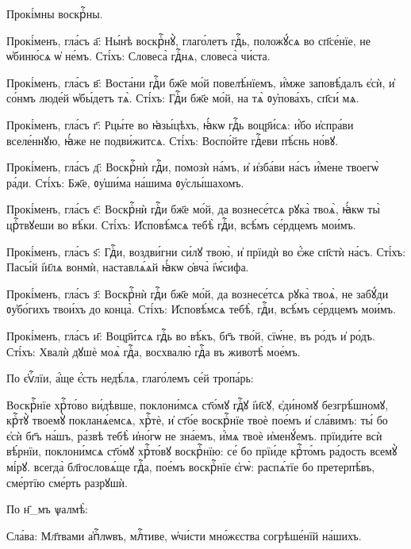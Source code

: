 \hKv Прокі́мны воскрⷭ҇ны. 

\hKv Прокі́менъ, гла́съ а҃: Ны́нѣ воскрⷭ҇нꙋ̀, глаго́летъ гдⷭ҇ь,  положꙋ́сѧ во сп҃се́нїе, не ѡ҆биню́сѧ ѡ҆ не́мъ. Сті́хъ:  Словеса̀ гдⷭ҇нѧ, словеса̀ чи́ста. 

\hKv Прокі́менъ, гла́съ в҃: Воста́ни гдⷭ҇и бж҃е мо́й  повелѣ́нїемъ, и҆́мже заповѣ́далъ є҆сѝ, и҆ со́нмъ люде́й  ѡ҆бы́детъ тѧ̀. Сті́хъ: Гдⷭ҇и бж҃е мо́й, на тѧ̀ ᲂу҆пова́хъ,  сп҃си́ мѧ. 

\hKv Прокі́менъ, гла́съ г҃: Рцы́те во ꙗ҆зы́цѣхъ, ꙗ҆́кѡ гдⷭ҇ь  воцр҃и́сѧ: и҆́бо и҆спра́ви вселе́ннꙋю, ꙗ҆́же не  подви́житсѧ. Сті́хъ: Воспо́йте гдⷭ҇еви пѣ́снь но́вꙋ. 

\hKv Прокі́менъ, гла́съ д҃: Воскрⷭ҇нѝ гдⷭ҇и, помозѝ на́мъ, и҆  и҆зба́ви на́съ и҆́мене твоегѡ̀ ра́ди. Сті́хъ: Бж҃е,  ᲂу҆ши́ма на́шима ᲂу҆слы́шахомъ.  

\hKv Прокі́менъ, гла́съ є҃: Воскрⷭ҇нѝ гдⷭ҇и бж҃е мо́й, да  вознесе́тсѧ рꙋка̀ твоѧ̀, ꙗ҆́кѡ ты̀ црⷭ҇твꙋеши во вѣ́ки.  Сті́хъ: И҆сповѣ́мсѧ тебѣ̀ гдⷭ҇и, всѣ́мъ се́рдцемъ мои́мъ. 

\hKv Прокі́менъ, гла́съ ѕ҃: Гдⷭ҇и, воздви́гни си́лꙋ твою̀, и҆  прїидѝ во є҆́же сп҃стѝ на́съ. Сті́хъ: Пасы́й і҆и҃лѧ  вонмѝ, наставлѧ́ѧй ꙗ҆́кѡ ѻ҆вча̀ і҆ѡ́сифа. 

\hKv Прокі́менъ, гла́съ з҃: Воскрⷭ҇нѝ гдⷭ҇и бж҃е мо́й, да  вознесе́тсѧ рꙋка̀ твоѧ̀, не забꙋ́ди ᲂу҆бо́гихъ твои́хъ до  конца̀. Сті́хъ: И҆сповѣ́мсѧ тебѣ̀, гдⷭ҇и, всѣ́мъ  се́рдцемъ мои́мъ.  

\hKv Прокі́менъ, гла́съ и҃: Воцр҃и́тсѧ гдⷭ҇ь во вѣ́къ, бг҃ъ  тво́й, сїѡ́не, въ ро́дъ и҆ ро́дъ. Сті́хъ: Хвалѝ дꙋшѐ моѧ̀  гдⷭ҇а, восхвалю̀ гдⷭ҇а въ животѣ̀ мое́мъ. 

\hKv По є҆ѵⷢ҇лїи, а҆́ще є҆́сть недѣ́лѧ, глаго́лемъ се́й  тропа́рь: 

\hKv Воскрⷭ҇нїе хрⷭ҇то́во ви́дѣвше, поклони́мсѧ ст҃о́мꙋ гдⷭ҇ꙋ  і҆и҃сꙋ, є҆ди́номꙋ безгрѣ́шномꙋ,  крⷭ҇тꙋ̀ твоемꙋ̀ покланѧ́емсѧ, хрⷭ҇тѐ, и҆ ст҃о́е  воскрⷭ҇нїе твоѐ пое́мъ и҆ сла́вимъ: ты́ бо є҆сѝ бг҃ъ  на́шъ, ра́звѣ тебѣ̀ и҆но́гѡ не зна́емъ, и҆́мѧ твоѐ  и҆менꙋ́емъ. прїиди́те всѝ вѣ́рнїи, поклони́мсѧ ст҃о́мꙋ  хрⷭ҇то́вꙋ воскрⷭ҇нїю: се́ бо прїи́де крⷭ҇то́мъ ра́дость  всемꙋ̀ мі́рꙋ. всегда̀ бл҃гословѧ́ще гдⷭ҇а, пое́мъ воскрⷭ҇нїе  є҆гѡ̀: распѧ́тїе бо претерпѣ́въ, сме́ртїю сме́рть  разрꙋшѝ. 

\hKv По н҃_мъ ѱалмѣ̀: 

\hKv Сла́ва: Мл҃твами а҆пⷭ҇лѡвъ, млⷭ҇тиве, ѡ҆чи́сти мно́жєства  согрѣше́нїй на́шихъ.  

